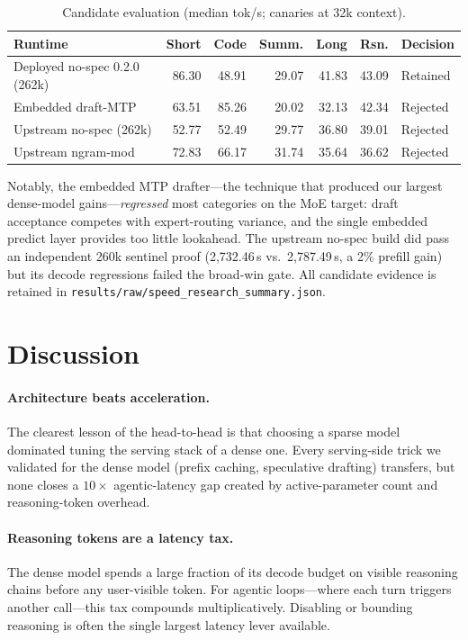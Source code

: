 \documentclass[11pt]{article}
\begin{document}
\begin{table}[h]
\centering
\caption{Candidate evaluation (median tok/s; canaries at 32k context).}
\label{tab:neg}
\begin{tabular}{lrrrrrl}
\toprule
Runtime & Short & Code & Summ. & Long & Rsn. & Decision \\
\midrule
Deployed no-spec 0.2.0 (262k) & 86.30 & 48.91 & 29.07 & 41.83 & 43.09 & Retained \\
Embedded draft-MTP            & 63.51 & 85.26 & 20.02 & 32.13 & 42.34 & Rejected \\
Upstream no-spec (262k)       & 52.77 & 52.49 & 29.77 & 36.80 & 39.01 & Rejected \\
Upstream ngram-mod            & 72.83 & 66.17 & 31.74 & 35.64 & 36.62 & Rejected \\
\bottomrule
\end{tabular}
\end{table}

Notably, the embedded MTP drafter---the technique that produced our largest
dense-model gains---\emph{regressed} most categories on the MoE target:
draft acceptance competes with expert-routing variance, and the single
embedded predict layer provides too little lookahead. The upstream no-spec
build did pass an independent 260k sentinel proof (2{,}732.46\,s vs.\
2{,}787.49\,s, a 2\% prefill gain) but its decode regressions failed the
broad-win gate. All candidate evidence is retained in
\texttt{results/raw/speed\_research\_summary.json}.

\section{Discussion}

\paragraph{Architecture beats acceleration.} The clearest lesson of the
head-to-head is that choosing a sparse model dominated tuning the serving
stack of a dense one. Every serving-side trick we validated for the dense
model (prefix caching, speculative drafting) transfers, but none closes a
$10\times$ agentic-latency gap created by active-parameter count and
reasoning-token overhead.

\paragraph{Reasoning tokens are a latency tax.} The dense model spends a
large fraction of its decode budget on visible reasoning chains before any
user-visible token. For agentic loops---where each turn triggers another
call---this tax compounds multiplicatively. Disabling or bounding reasoning
is often the single largest latency lever available.
\end{document}
